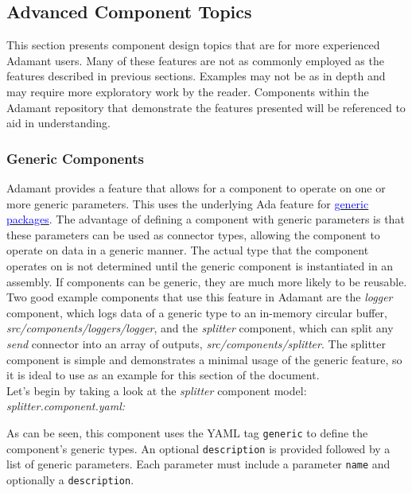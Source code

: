 \subsection{Advanced Component Topics}

This section presents component design topics that are for more experienced Adamant users. Many of these features are not as commonly employed as the features described in previous sections. Examples may not be as in depth and may require more exploratory work by the reader. Components within the Adamant repository that demonstrate the features presented will be referenced to aid in understanding.

\subsubsection{Generic Components}

Adamant provides a feature that allows for a component to operate on one or more generic parameters. This uses the underlying Ada feature for \href{https://learn.adacore.com/courses/intro-to-ada/chapters/generics.html}{\textcolor{blue}{generic packages}}. The advantage of defining a component with generic parameters is that these parameters can be used as connector types, allowing the component to operate on data in a generic manner. The actual type that the component operates on is not determined until the generic component is instantiated in an assembly. If components can be generic, they are much more likely to be reusable. \\

Two good example components that use this feature in Adamant are the \textit{logger} component, which logs data of a generic type to an in-memory circular buffer, \textit{src/components/loggers/logger}, and the \textit{splitter} component, which can split any \textit{send} connector into an array of outputs, \textit{src/components/splitter}. The splitter component is simple and demonstrates a minimal usage of the generic feature, so it is ideal to use as an example for this section of the document. \\

Let's begin by taking a look at the \textit{splitter} component model: \\

\textit{splitter.component.yaml:} 

As can be seen, this component uses the YAML tag \texttt{generic} to define the component's generic types. An optional \texttt{description} is provided followed by a list of generic parameters. Each parameter must include a parameter \texttt{name} and optionally a \texttt{description}. \\

